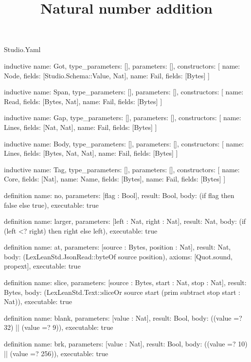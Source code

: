 \begin{lexlean}{Studio.Yaml}
\title{Natural number addition}
\begin{semanticmodule}
inductive{
  name: Got,
  type_parameters: [],
  parameters: [],
  constructors: [
    {name: Node, fields: [Studio.Schema::Value, Nat]},
    {name: Fail, fields: [Bytes]}
  ]
}

inductive{
  name: Span,
  type_parameters: [],
  parameters: [],
  constructors: [
    {name: Read, fields: [Bytes, Nat]},
    {name: Fail, fields: [Bytes]}
  ]
}

inductive{
  name: Gap,
  type_parameters: [],
  parameters: [],
  constructors: [
    {name: Lines, fields: [Nat, Nat]},
    {name: Fail, fields: [Bytes]}
  ]
}

inductive{
  name: Body,
  type_parameters: [],
  parameters: [],
  constructors: [
    {name: Lines, fields: [Bytes, Nat, Nat]},
    {name: Fail, fields: [Bytes]}
  ]
}

inductive{
  name: Tag,
  type_parameters: [],
  parameters: [],
  constructors: [
    {name: Core, fields: [Nat]},
    {name: Name, fields: [Bytes]},
    {name: Fail, fields: [Bytes]}
  ]
}

definition{
  name: no,
  parameters: [flag : Bool],
  result: Bool,
  body: (if flag then false else true),
  executable: true
}

definition{
  name: larger,
  parameters: [left : Nat, right : Nat],
  result: Nat,
  body: (if (left <? right) then right else left),
  executable: true
}

definition{
  name: at,
  parameters: [source : Bytes, position : Nat],
  result: Nat,
  body: (LexLeanStd.JsonRead::byteOf source position),
  axioms: [Quot.sound, propext],
  executable: true
}

definition{
  name: slice,
  parameters: [source : Bytes, start : Nat, stop : Nat],
  result: Bytes,
  body: (LexLeanStd.Text::sliceOr source start (prim subtract stop start : Nat)),
  executable: true
}

definition{
  name: blank,
  parameters: [value : Nat],
  result: Bool,
  body: ((value =? 32) || (value =? 9)),
  executable: true
}

definition{
  name: brk,
  parameters: [value : Nat],
  result: Bool,
  body: ((value =? 10) || (value =? 256)),
  executable: true
}


\end{semanticmodule}
\end{lexlean}
